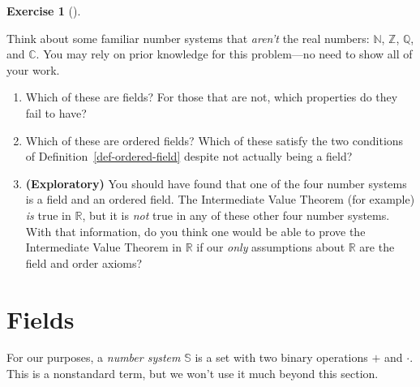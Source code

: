 \documentclass[
  letterpaper,
  DIV=11,
  numbers=noendperiod]{scrreprt}
\providecommand{\tightlist}{%
  \setlength{\itemsep}{0pt}\setlength{\parskip}{0pt}}
\def\R{\mathbb R}
\theoremstyle{plain}
\theoremstyle{definition}
\newtheorem{exercise}{Exercise}[chapter]
\theoremstyle{plain}
\theoremstyle{plain}
\theoremstyle{definition}
\theoremstyle{definition}
\theoremstyle{remark}
\begin{document}
\begin{exercise}[]\protect\hypertarget{exr-number-system-properties}{}\label{exr-number-system-properties}

Think about some familiar number systems that \emph{aren't} the real
numbers: \(\mathbb{N}\), \(\mathbb{Z}\), \(\mathbb{Q}\), and
\(\mathbb{C}\). You may rely on prior knowledge for this problem---no
need to show all of your work.

\begin{enumerate}
\def\labelenumi{\arabic{enumi}.}
\tightlist
\item
  Which of these are fields? For those that are not, which properties do
  they fail to have?
\item
  Which of these are ordered fields? Which of these satisfy the two
  conditions of Definition~\ref{def-ordered-field} despite not actually
  being a field?
\item
  \textbf{(Exploratory)} You should have found that one of the four
  number systems is a field and an ordered field. The Intermediate Value
  Theorem (for example) \emph{is} true in \(\R\), but it is \emph{not}
  true in any of these other four number systems. With that information,
  do you think one would be able to prove the Intermediate Value Theorem
  in \(\R\) if our \emph{only} assumptions about \(\R\) are the field
  and order axioms?
\end{enumerate}

\end{exercise}

\section{Fields}\label{fields}

For our purposes, a \emph{number system} \(\mathbb{S}\) is a set with
two binary operations \(+\) and \(\cdot\). This is a nonstandard term,
but we won't use it much beyond this section.
\end{document}
